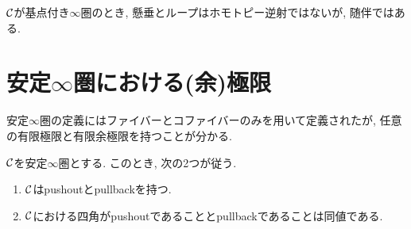 \documentclass[uplatex, a4paper, 14Q, dvipdfmx]{jsarticle}
\begin{document}
\begin{remark}
  $\mathcal{C}$が基点付き$\infty$圏のとき, 懸垂とループはホモトピー逆射ではないが, 随伴ではある.
\end{remark}


\section{安定\texorpdfstring{$\infty$}{infty}圏における(余)極限}

安定$\infty$圏の定義にはファイバーとコファイバーのみを用いて定義されたが, 任意の有限極限と有限余極限を持つことが分かる. 

\begin{lemma} \label{prop:stable_has_pushout_pullback}
  $\mathcal{C}$を安定$\infty$圏とする.
  このとき, 次の2つが従う.
  \begin{enumerate}
    \item $\mathcal{C}$はpushoutとpullbackを持つ. 
    \item $\mathcal{C}$における四角がpushoutであることとpullbackであることは同値である.
  \end{enumerate}
\end{lemma}
\end{document}
